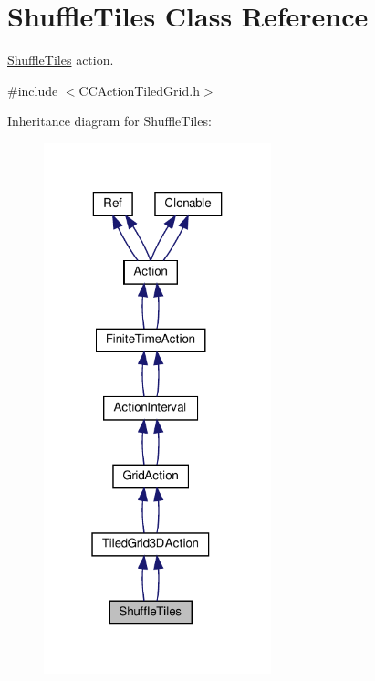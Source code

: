 \hypertarget{classShuffleTiles}{}\section{Shuffle\+Tiles Class Reference}
\label{classShuffleTiles}


\hyperlink{classShuffleTiles}{Shuffle\+Tiles} action.  




{\ttfamily \#include $<$C\+C\+Action\+Tiled\+Grid.\+h$>$}



Inheritance diagram for Shuffle\+Tiles\+:
\nopagebreak
\begin{figure}[H]
\begin{center}
\leavevmode
\includegraphics[width=187pt]{classShuffleTiles__inherit__graph}
\end{center}
\end{figure}


